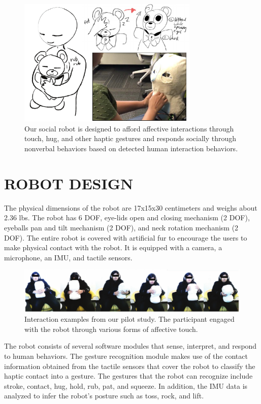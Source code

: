 \documentclass[letterpaper, 10 pt, conference]{ieeeconf}  %
\begin{document}
\begin{figure}[t!]
\centering
\includegraphics[width=3.4in]{teaser2.pdf}
\caption{Our social robot is designed to afford affective interactions through touch, hug, and other haptic gestures and responds socially through nonverbal behaviors based on detected human interaction behaviors.}
\label{fig:teaser}
\end{figure}

\section{ROBOT DESIGN}
The physical dimensions of the robot are 17x15x30 centimeters and weighs about 2.36 lbs. The robot has 6 DOF, eye-lids open and closing mechanism (2 DOF), eyeballs pan and tilt mechanism (2 DOF), and neck rotation mechanism (2 DOF). The entire robot is covered with artificial fur to encourage the users to make physical contact with the robot. It is equipped with a camera, a microphone, an IMU, and tactile sensors.  

\begin{figure}[t!]
\centering
\includegraphics[width=\textwidth]{pilot-data.pdf}
\caption{Interaction examples from our pilot study. The participant engaged with the robot through various forms of affective touch.}
\label{fig:pilot-study}
\end{figure}

The robot consists of several software modules that sense, interpret, and respond to human behaviors. The gesture recognition module makes use of the contact information obtained from the tactile sensors that cover the robot to classify the haptic contact into a gesture. The gestures that the robot can recognize include stroke, contact, hug, hold, rub, pat, and squeeze. In addition, the IMU data is analyzed to infer the robot's posture such as toss, rock, and lift.  
\end{document}
